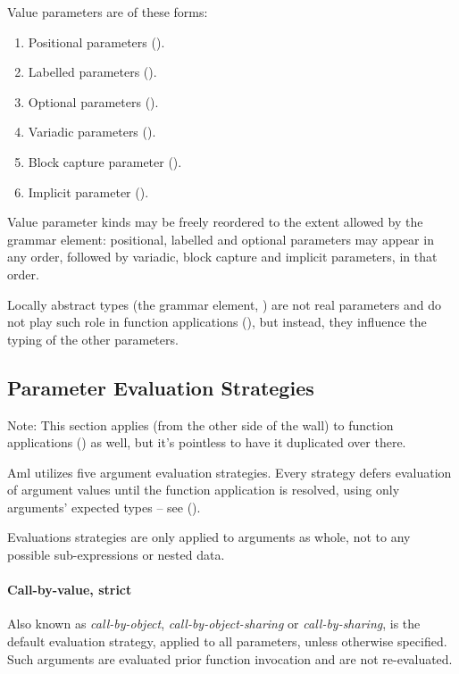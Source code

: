Value parameters are of these forms:
\begin{enumerate}
  \item Positional parameters (). 
  \item Labelled parameters (). 
  \item Optional parameters (). 
  \item Variadic parameters ().
  \item Block capture parameter ().
  \item Implicit parameter ().
\end{enumerate}

Value parameter kinds may be freely reordered to the extent allowed by the  grammar element: positional, labelled and optional parameters may appear in any order, followed by variadic, block capture and implicit parameters, in that order. 

Locally abstract types (the  grammar element, ) are not real parameters and do not play such role in function applications (), but instead, they influence the typing of the other parameters. 





\subsection{Parameter Evaluation Strategies}
\label{sec:param-eval-strategies}

Note: This section applies (from the other side of the wall) to function applications () as well, but it's pointless to have it duplicated over there. 

Aml utilizes five argument evaluation strategies. Every strategy defers evaluation of argument values until the function application is resolved, using only arguments' expected types -- see (). 

Evaluations strategies are only applied to arguments as whole, not to any possible sub-expressions or nested data. 

\paragraph{Call-by-value, strict}
Also known as {\em call-by-object}, {\em call-by-object-sharing} or {\em call-by-sharing}, is the default evaluation strategy, applied to all parameters, unless otherwise specified. Such arguments are evaluated prior function invocation and are not re-evaluated. 

